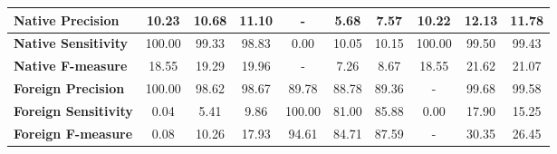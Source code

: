 \begin{table}[htp]
{\begin{tabular}{l|c|c|c|c|c|c|c|c|c|}
			\multicolumn{1}{|l|}{\textbf{Native Precision}}          & 10.23                             & 10.68                             & 11.10                            & -                                 & 5.68                              & 7.57                             & 10.22                             & 12.13                             & 11.78                            \\ \hline
			\multicolumn{1}{|l|}{\textbf{Native Sensitivity}}        & 100.00                            & 99.33                             & 98.83                            & 0.00                              & 10.05                             & 10.15                            & 100.00                            & 99.50                             & 99.43                            \\ \hline
			\multicolumn{1}{|l|}{\textbf{Native F-measure}}          & 18.55                             & 19.29                             & 19.96                            & -                                 & 7.26                              & 8.67                             & 18.55                             & 21.62                             & 21.07                            \\ \hline
			\multicolumn{1}{|l|}{\textbf{Foreign Precision}}         & 100.00                            & 98.62                             & 98.67                            & 89.78                             & 88.78                             & 89.36                            & -                                 & 99.68                             & 99.58                            \\ \hline
			\multicolumn{1}{|l|}{\textbf{Foreign Sensitivity}}       & 0.04                              & 5.41                              & 9.86                             & 100.00                            & 81.00                             & 85.88                            & 0.00                              & 17.90                             & 15.25                            \\ \hline
			\multicolumn{1}{|l|}{\textbf{Foreign F-measure}}         & 0.08                              & 10.26                             & 17.93                            & 94.61                             & 84.71                             & 87.59                            & -                                 & 30.35                             & 26.45                            \\ \hline
		\end{tabular}
	}
\end{table}

